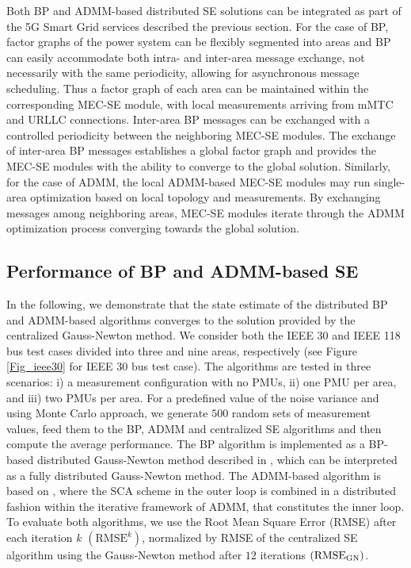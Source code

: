 \documentclass[journal]{IEEEtran}
\begin{document}
Both BP and ADMM-based distributed SE solutions can be integrated as part of the 5G Smart Grid services described the previous section. For the case of BP, factor graphs of the power system can be flexibly segmented into areas and BP can easily accommodate both intra- and inter-area message exchange, not necessarily with the same periodicity, allowing for asynchronous message scheduling. Thus a factor graph of each area can be maintained within the corresponding MEC-SE module, with local measurements arriving from mMTC and URLLC connections. Inter-area BP messages can be exchanged with a controlled periodicity between the neighboring MEC-SE modules. The exchange of inter-area BP messages establishes a global factor graph and provides the MEC-SE modules with the ability to converge to the global solution. Similarly, for the case of ADMM, the local ADMM-based MEC-SE modules may run single-area optimization based on local topology and measurements. By exchanging messages among neighboring areas, MEC-SE modules iterate through the ADMM optimization process converging towards the global solution.

\subsection{Performance of BP and ADMM-based SE}

In the following, we demonstrate that the state estimate of the distributed BP and ADMM-based algorithms converges to the solution provided by the centralized Gauss-Newton method. We consider both the IEEE 30 and IEEE 118 bus test cases divided into three and nine areas, respectively (see Figure \ref{Fig_ieee30} for IEEE 30 bus test case). The algorithms are tested in three scenarios: i) a measurement configuration with no PMUs, ii) one PMU per area, and iii) two PMUs per area. For a predefined value of the noise variance and using Monte Carlo approach, we generate $500$ random sets of measurement values, feed them to the BP, ADMM and centralized SE algorithms and then compute the average performance. The BP algorithm is implemented as a BP-based distributed Gauss-Newton method described in \cite{vukobratovic}, which can be interpreted as a fully distributed Gauss-Newton method. The ADMM-based algorithm is based on \cite{haro}, where the SCA scheme in the outer loop is combined in a distributed fashion within the iterative framework of ADMM, that constitutes the inner loop. To evaluate both algorithms, we use the Root Mean Square Error (RMSE) after each iteration $k$ $(\mathrm{RMSE}^k)$, normalized by RMSE of the centralized SE algorithm using the Gauss-Newton method after $12$ iterations $(\mathrm{RMSE}_{\mbox{\scriptsize GN}})$. 
\end{document}
